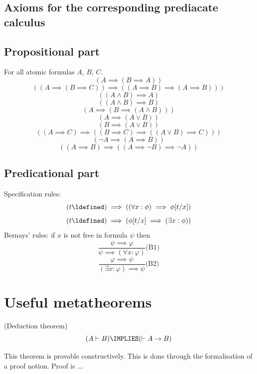 
\subsection{Axioms for the corresponding prediacate calculus}
\subsection{Propositional part}
For all atomic formulas $A$, $B$, $C$.
\[
(A \implies (B \implies A))
\]
\[
((A \implies (B \implies C))\implies ((A \implies B) \implies (A \implies B)))
\]
\[
((A\land B) \implies A)
\]
\[
((A\land B) \implies B)
\]
\[
(A \implies (B\implies (A\land B)))
\]
\[
(A \implies (A\lor B))
\]
\[
(B \implies (A\lor B))
\]
\[
((A \implies C)\implies ((B \implies C) \implies ((A\lor B)\implies C)))
\]
\[
(\neg A \implies (A\implies B))
\]
\[
((A\implies B)\implies ((A \implies \neg B) \implies \neg A) )
\]
\subsection{Predicational part}
Specification rules:
\[
(t\ldefined)\implies ((\forall x: \phi) \implies \phi[t/x])
\]
\[
(t\ldefined) \implies (\phi[t/x] \implies (\exists x: \phi))
\]
Bernays' rules: if $x$ is not free in formula $\psi$ then
\[
\frac{
\psi \implies \varphi
}{
\psi \implies (\forall x:\varphi)
}\mbox{(B1)}
\]
\[
\frac{
\varphi \implies \psi
}{
(\exists x:\varphi)\implies \psi
}\mbox{(B2)}
\]



\section{Useful metatheorems}

\begin{theorem}(Deduction theorem)
\[
(A \vdash B)
\IMPLIES
(\vdash A\to B)
\]
\end{theorem}
\Proof
This theorem is provable constructively.
This is done through the formalisation of a proof notion.
Proof is ...
\Done

